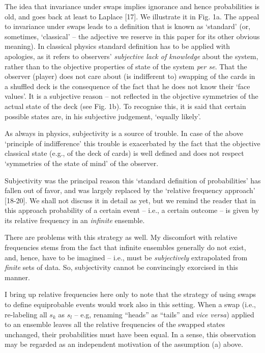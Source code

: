 \documentclass[aps,twocolumn,pra,epsfig]{revtex4}
\begin{document}
The idea that invariance under swaps implies ignorance and hence probabilities
is old, and goes back at least to Laplace [17]. We illustrate it in Fig. 1a. The appeal to
invariance under swaps leads to a definition that is known as `standard' 
(or, sometimes, `classical' -- the adjective we reserve in this paper
for its other obvious meaning). In classical physics standard definition has
to be applied with apologies, as it refers to observers' {\it subjective lack
of knowledge} about the system, rather than to the objective properties of
state of the system {\it per se}. That the observer (player) does not care about 
(is indifferent to) swapping of the cards in a shuffled deck is the consequence 
of the fact that he does not know their  `face values'.  It is a subjective reason
-- not reflected in the objective symmetries of the actual state of the deck 
(see Fig. 1b). To recognise this, it is said that certain possible states are,
in his subjective judgement, `equally likely'.

As always in physics, subjectivity is a source of trouble. In case of the above
`principle of indifference' this trouble is exacerbated by the fact that the objective
classical state (e.g., of the deck of cards) is well defined and does not 
respect `symmetries of the state of mind' of the observer.

Subjectivity was the principal reason this  `standard definition of probabilities' 
has fallen out of
favor, and was largely replaced by the `relative frequency approach' [18-20].
We shall not discuss it in detail as yet, but we remind the reader that in this
approach probability of a certain event -- i.e., a certain outcome -- is given
by its relative frequency in an {\it infinite} ensemble.

There are problems with this strategy as well. My discomfort with relative
frequencies stems from the fact that infinite ensembles generally do not exist,
and, hence, have to be imagined -- i.e., must be {\it subjectively} extrapolated 
from {\it finite} sets of data. So, subjectivity cannot be convincingly
exorcised in this manner.

I bring up relative frequencies here only to note
that the strategy of using swaps to define equiprobable events would work also
in this setting. When a swap (i.e., re-labeling all $s_k$ as $s_l$ -- e.g, renaming
``heads'' as ``tails''
and {\it vice versa}) applied to an ensemble leaves all the relative
frequencies of the swapped states unchanged, their probabilities must have
been equal. In a sense, this observation may be regarded as an independent
motivation of the assumption (a) above.
\end{document}
